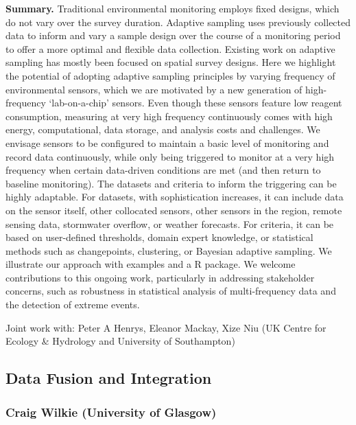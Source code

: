 \documentclass[
  11pt,
  letterpaper,
  DIV=11,
  numbers=noendperiod]{scrartcl}
\begin{document}
\textbf{Summary.} Traditional environmental monitoring employs fixed
designs, which do not vary over the survey duration. Adaptive sampling
uses previously collected data to inform and vary a sample design over
the course of a monitoring period to offer a more optimal and flexible
data collection. Existing work on adaptive sampling has mostly been
focused on spatial survey designs. Here we highlight the potential of
adopting adaptive sampling principles by varying frequency of
environmental sensors, which we are motivated by a new generation of
high-frequency `lab-on-a-chip' sensors. Even though these sensors
feature low reagent consumption, measuring at very high frequency
continuously comes with high energy, computational, data storage, and
analysis costs and challenges. We envisage sensors to be configured to
maintain a basic level of monitoring and record data continuously, while
only being triggered to monitor at a very high frequency when certain
data-driven conditions are met (and then return to baseline monitoring).
The datasets and criteria to inform the triggering can be highly
adaptable. For datasets, with sophistication increases, it can include
data on the sensor itself, other collocated sensors, other sensors in
the region, remote sensing data, stormwater overflow, or weather
forecasts. For criteria, it can be based on user-defined thresholds,
domain expert knowledge, or statistical methods such as changepoints,
clustering, or Bayesian adaptive sampling. We illustrate our approach
with examples and a R package. We welcome contributions to this ongoing
work, particularly in addressing stakeholder concerns, such as
robustness in statistical analysis of multi-frequency data and the
detection of extreme events.

Joint work with: Peter A Henrys, Eleanor Mackay, Xize Niu (UK Centre for
Ecology \& Hydrology and University of Southampton)

\subsection{Data Fusion and
Integration}\label{data-fusion-and-integration}

\subsubsection[\textbf{Craig Wilkie} (University of Glasgow) \\Data fusion approaches for environmental data]{Craig Wilkie (University of Glasgow)}
\end{document}
